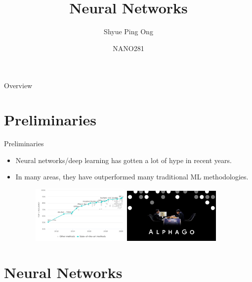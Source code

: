 \documentclass[aspectratio=169]{beamer}
\title[Neural Networks]{Neural Networks}
\author{Shyue Ping Ong}
\institute[UCSD]{University of California, San Diego\\
\medskip
}
\date{NANO281} %
\begin{document}
\begin{frame}
    \titlepage %
\end{frame}


\begin{frame}{Overview}
    \tableofcontents
\end{frame}


\section{Preliminaries}

\begin{frame}{Preliminaries}
    \begin{itemize}
        \item Neural networks/deep learning has gotten a lot of hype in recent years.
        \item In many areas, they have outperformed many traditional ML methodologies.
    \begin{figure}
        \centering
        \includegraphics[width=0.45\textwidth]{figures/imagenet.pdf}
        \includegraphics[width=0.45\textwidth]{figures/alphago.jpg}
    \end{figure}
    \end{itemize}

\end{frame}

\section{Neural Networks}
\end{document}
